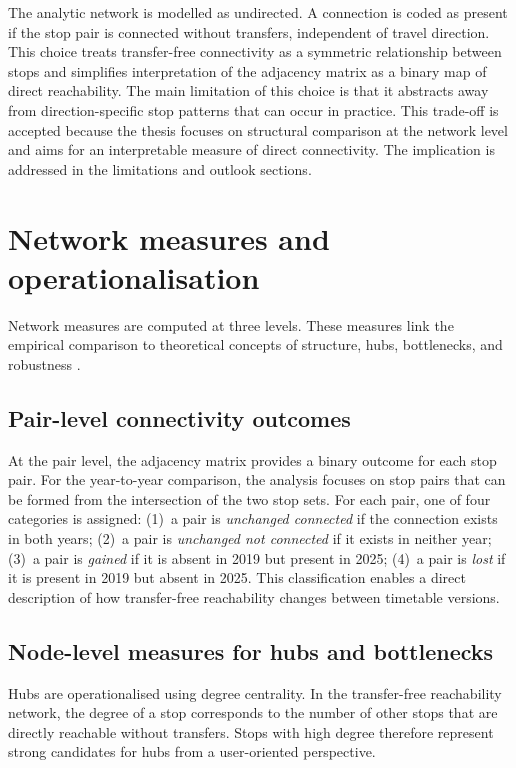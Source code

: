 \documentclass[12pt,a4paper,oneside]{report}
\begin{document}
The analytic network is modelled as undirected.
A connection is coded as present if the stop pair is connected without transfers, independent of travel direction.
This choice treats transfer-free connectivity as a symmetric relationship between stops and simplifies interpretation of the adjacency matrix as a binary map of direct reachability.
The main limitation of this choice is that it abstracts away from direction-specific stop patterns that can occur in practice.
This trade-off is accepted because the thesis focuses on structural comparison at the network level and aims for an interpretable measure of direct connectivity.
The implication is addressed in the limitations and outlook sections.

\section{Network measures and operationalisation}\label{sec:network-measures}

Network measures are computed at three levels.
These measures link the empirical comparison to theoretical concepts of structure, hubs, bottlenecks, and robustness \citep{barthelemy2011,derrible2010}.

\subsection{Pair-level connectivity outcomes}\label{sec:pair-connectivity}

At the pair level, the adjacency matrix provides a binary outcome for each stop pair.
For the year-to-year comparison, the analysis focuses on stop pairs that can be formed from the intersection of the two stop sets.
For each pair, one of four categories is assigned:
(1)~a pair is \emph{unchanged connected} if the connection exists in both years;
(2)~a pair is \emph{unchanged not connected} if it exists in neither year;
(3)~a pair is \emph{gained} if it is absent in 2019 but present in 2025;
(4)~a pair is \emph{lost} if it is present in 2019 but absent in 2025.
This classification enables a direct description of how transfer-free reachability changes between timetable versions.

\subsection{Node-level measures for hubs and bottlenecks}\label{sec:node-measures}

Hubs are operationalised using degree centrality.
In the transfer-free reachability network, the degree of a stop corresponds to the number of other stops that are directly reachable without transfers.
Stops with high degree therefore represent strong candidates for hubs from a user-oriented perspective.
\end{document}
